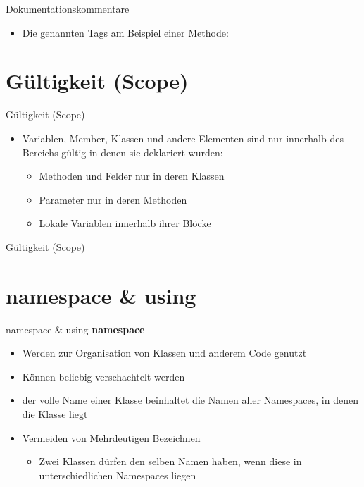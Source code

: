 \begin{frame}{Dokumentationskommentare}
	\begin{itemize}
		\item Die genannten Tags am Beispiel einer Methode:
	\end{itemize}
		
\end{frame}

\section{Gültigkeit (Scope)}
\begin{frame}{Gültigkeit (Scope)}
	\begin{itemize}
		\item Variablen, Member, Klassen und andere Elementen sind nur innerhalb des Bereichs gültig in denen sie deklariert wurden:
		\begin{itemize}
			\item Methoden und Felder nur in deren Klassen
			\item Parameter nur in deren Methoden
			\item Lokale Variablen innerhalb ihrer Blöcke
		\end{itemize}
	\end{itemize}
\end{frame}

\begin{frame}{Gültigkeit (Scope)}
	
\end{frame}

\section{namespace \& using}
\begin{frame}{namespace \& using}
	\textbf{namespace}\\
	\begin{itemize}
		\item Werden zur Organisation von Klassen und anderem Code genutzt 
		\item Können beliebig verschachtelt werden
		\item der volle Name einer Klasse beinhaltet die Namen aller Namespaces, in denen die Klasse liegt
		\item Vermeiden von Mehrdeutigen Bezeichnen 
		\begin{itemize}
			\item Zwei Klassen dürfen den selben Namen haben, wenn diese in unterschiedlichen Namespaces liegen		
		\end{itemize}
	\end{itemize}	
	
\end{frame}

